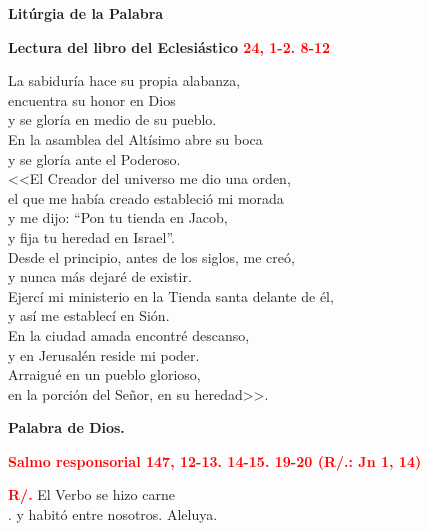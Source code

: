 \documentclass[12pt, letterpaper]{report}
\begin{document}
\newpage

\begin{center}
\Huge {\bfseries Lit\'urgia de la Palabra}
\end{center}

\Large {\bfseries Lectura del libro del Eclesi\'astico \hspace{1cm} \textcolor{red}{24, 1-2. 8-12}} \newline

\Large La sabidur\'ia hace su propia alabanza, \\
encuentra su honor en Dios \\
y se glor\'ia en medio de su pueblo. \\
En la asamblea del Alt\'isimo abre su boca \\
y se glor\'ia ante el Poderoso. \\
<<El Creador del universo me dio una orden, \\
el que me hab\'ia creado estableci\'o mi morada \\
y me dijo: ``Pon tu tienda en Jacob, \\
y fija tu heredad en Israel''. \\
Desde el principio, antes de los siglos, me cre\'o, \\
y nunca m\'as dejar\'e de existir. \\
Ejerc\'i mi ministerio en la Tienda santa delante de \'el, \\
y as\'i me establec\'i en Si\'on. \\
En la ciudad amada encontr\'e descanso, \\
y en Jerusal\'en reside mi poder. \\
Arraigu\'e en un pueblo glorioso, \\
en la porci\'on del Se\~nor, en su heredad>>. \newline

{\bfseries Palabra de Dios.}

\newpage

\Large {\bfseries \textcolor{red}{Salmo responsorial \hspace{1cm} 147, 12-13. 14-15. 19-20 (R/.: Jn 1, 14)}} \newline

\Large {\bfseries \textcolor{red}{R/.}} \hspace{1cm} El Verbo se hizo carne \\
. \hspace{2.3cm} y habit\'o entre nosotros. Aleluya. \newline
\end{document}
